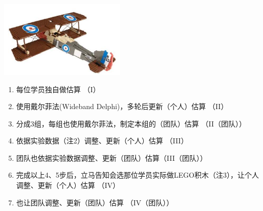 
\includegraphics[width=6cm]{Lego1.jpg}\\

\begin{enumerate}
\tightlist
\item
  每位学员独自做估算 （I）
\item
  使用戴尔菲法(Wideband Delphi)，多轮后更新（个人）估算 （II）
\item
  分成3组，每组也使用戴尔菲法，制定本组的（团队）估算 （II（团队））
\item
  依据实验数据（注2）调整、更新（个人）估算 （III）
\item
  团队也依据实验数据调整、更新（团队）估算（III（团队））
\item
  完成以上4、5步后，立马告知会选那位学员实际做LEGO积木（注3），让个人调整、更新（个人）估算
  （IV）
\item
  也让团队调整、更新（团队）估算 （IV（团队））
\end{enumerate}

